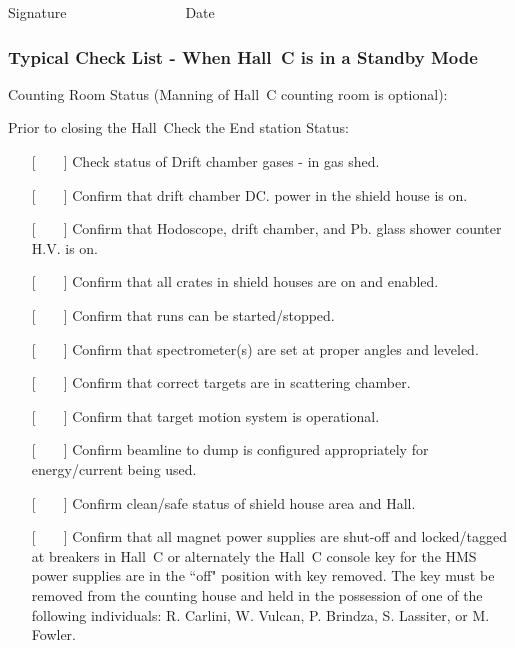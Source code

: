 \vspace{0.5in}
\hspace*{\fill}{\underline{~~~~~~~~~~~~~~~~~~~~~~~~~~~~~~~~~}}
\newline
\hspace*{\fill} {Signature~~~~~~~~~~~~~~~~~Date} 

\newpage
\subsubsection{Typical Check List - When Hall~C is in a Standby Mode}

\noindent Counting Room Status (Manning of Hall~C counting room is optional):
\vspace{\baselineskip}

\noindent Prior to closing the Hall~Check the End station Status:
\vspace{\baselineskip}

\begin{itemize}

\item[{[~~~~]}] Check status of Drift chamber gases - in gas shed.
\item[{[~~~~]}] Confirm that drift chamber DC. power in the shield house is on.
\item[{[~~~~]}] Confirm that Hodoscope, drift chamber, and Pb. glass shower counter 
H.V. is on.
\item[{[~~~~]}] Confirm that all crates in shield houses are on and enabled.
\item[{[~~~~]}] Confirm that runs can be started/stopped.
\item[{[~~~~]}] Confirm that spectrometer(s) are set at proper angles and leveled.
\item[{[~~~~]}] Confirm that correct targets are in scattering chamber.
\item[{[~~~~]}] Confirm that target motion system is operational.
\item[{[~~~~]}] Confirm beamline to dump is configured appropriately for 
energy/current
being used.
\item[{[~~~~]}] Confirm clean/safe status of shield house area and Hall.
\item[{[~~~~]}] Confirm that all magnet power supplies are shut-off and locked/tagged at breakers in 
Hall~C or alternately the Hall~C console key for the HMS power supplies are in 
the ``off" position with key removed. The key must be removed from the counting 
house and held in the possession of one of the following individuals: R. 
Carlini, W. Vulcan, P. Brindza, S. Lassiter, or M. Fowler.

\end{itemize}

